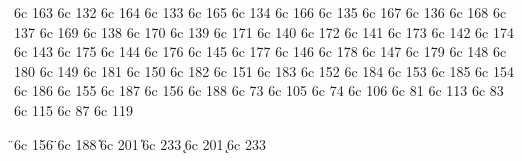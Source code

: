 \characterdef \cyrghk        6c  163
\characterdef \CYRSHHA       6c  132
\characterdef \cyrshha       6c  164
\characterdef \CYRRDSC       6c  133
\characterdef \cyrrdsc       6c  165
\characterdef \CYRRTICK      6c  134
\characterdef \cyrrtick      6c  166
\characterdef \CYRABHDZE     6c  135
\characterdef \cyrabhdze     6c  167
\characterdef \CYRMDSC       6c  136
\characterdef \cyrmdsc       6c  168
\characterdef \CYRKDSC       6c  137
\characterdef \cyrkdsc       6c  169
\characterdef \CYRLDSC       6c  138
\characterdef \cyrldsc       6c  170
\characterdef \CYRKHCRS      6c  139
\characterdef \cyrkhcrs      6c  171
\characterdef \CYRLHK        6c  140
\characterdef \cyrlhk        6c  172
\characterdef \CYRNDSC       6c  141
\characterdef \cyrndsc       6c  173
\characterdef \CYRMHK        6c  142
\characterdef \cyrmhk        6c  174
\characterdef \CYRNHK        6c  143
\characterdef \cyrnhk        6c  175
\characterdef \CYROTLD       6c  144
\characterdef \cyrotld       6c  176
\characterdef \CYRABHCH      6c  145
\characterdef \cyrabhch      6c  177
\characterdef \CYRABHCHDSC   6c  146
\characterdef \cyrabhchdsc   6c  178
\characterdef \CYRSEMISFTSN  6c  147
\characterdef \cyrsemisftsn  6c  179
\characterdef \CYRISHRTDSC   6c  148
\characterdef \cyrishrtdsc   6c  180
\characterdef \CYRHDSC       6c  149
\characterdef \cyrhdsc       6c  181
\characterdef \CYRDZHE       6c  150
\characterdef \cyrdzhe       6c  182
\characterdef \CYRABHHA      6c  151
\characterdef \cyrabhha      6c  183
\characterdef \CYRCHRDSC     6c  152
\characterdef \cyrchrdsc     6c  184
\characterdef \CYRNLHK       6c  153
\characterdef \cyrnlhk       6c  185
\characterdef \CYRSCHWA      6c  154
\characterdef \cyrschwa      6c  186
\characterdef \CYRRHK        6c  155
\characterdef \cyrrhk        6c  187
\characterdef \CYRYO         6c  156
\characterdef \cyryo         6c  188
\characterdef \CYRII         6c  73
\characterdef \cyrii         6c  105
\characterdef \CYRJE         6c  74
\characterdef \cyrje         6c  106
\characterdef \CYRQ          6c  81
\characterdef \cyrq          6c  113
\characterdef \CYRDZE        6c  83
\characterdef \cyrdze        6c  115
\characterdef \CYRW          6c  87
\characterdef \cyrw          6c  119

\accentdef \"  \CYRE      6c  156
\accentdef \"  \cyre      6c  188
\accentdef \U  \CYRI      6c  201
\accentdef \U  \cyri      6c  233
\accentdef \k  \CYRABHCH  6c  201
\accentdef \k  \cyrabhch  6c  233


